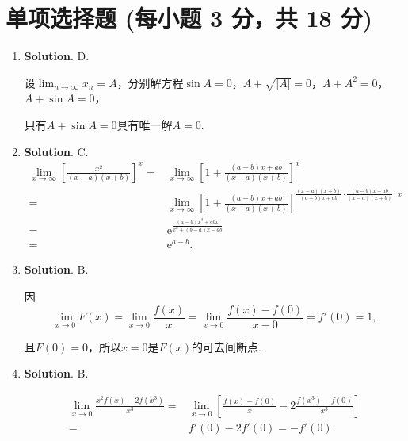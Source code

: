 \documentclass[../Main.tex]{subfiles}
\begin{document}
\section{单项选择题 (每小题 3 分，共 18 分)}
\begin{enumerate}
    \item \textbf{Solution}. D.

          设$\lim_{n\to\infty}x_{n}=A$，分别解方程$\sin A=0$，$A+\sqrt{|A|}=0$，$A+A^{2}
              =0$，$A+\sin A=0$，

          只有$A+\sin A=0$具有唯一解$A=0$.

    \item \textbf{Solution}. C.
          \[
              \begin{aligned}
                  \lim_{x\to\infty}\left[\frac{x^2}{(x-a)(x+b)}\right]^{x}= & \lim_{x\to\infty}\left[1+\frac{(a-b)x+ab}{(x-a)(x+b)}\right]^{x}                                                                    \\
                  =                                                         & \lim_{x\to\infty}\left[1+\frac{(a-b)x+ab}{(x-a)(x+b)}\right]^{\frac{(x-a)(x+b)}{(a-b)x+ab}\cdot\frac{(a-b)x+ab}{(x-a)(x+b)}\cdot x} \\
                  =                                                         & \mathrm{e}^{\frac{(a-b)x^2+abx}{x^2+(b-a)x-ab}}                                                                                     \\
                  =                                                         & \mathrm{e}^{a-b}.
              \end{aligned}
          \]

    \item \textbf{Solution}. B.

          因
          \[
              \lim_{x\to0}F(x)=\lim_{x\to0}\frac{f(x)}{x}=\lim_{x\to0}\frac{f(x)-f(0)}{x-0}
              =f'(0)=1,
          \]

          且$F(0)=0$，所以$x=0$是$F(x)$的可去间断点.

    \item \textbf{Solution}. B.

          \[
              \begin{aligned}
                  \lim_{x\to0}\frac{x^2f(x)-2f(x^3)}{x^3}= & \lim_{x\to0}\left[\frac{f(x)-f(0)}{x}-2\frac{f(x^3)-f(0)}{x^3}\right] \\
                  =                                        & f'(0)-2f'(0)=-f'(0).
              \end{aligned}
          \]


\end{enumerate}
\end{document}

